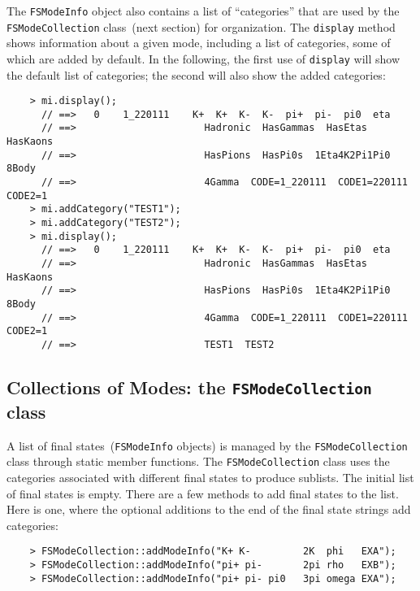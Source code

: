 \documentclass[11pt]{article}
\begin{document}
The {\tt FSModeInfo} object also contains a list of ``categories'' that are used by the {\tt FSModeCollection} class~(next section) for organization.  The {\tt display} method shows information about a given mode, including a list of categories, some of which are added by default.  In the following, the first use of {\tt display} will show the default list of categories; the second will also show the added categories:
\begin{verbatim}
    > mi.display();
      // ==>   0    1_220111    K+  K+  K-  K-  pi+  pi-  pi0  eta 
      // ==>                      Hadronic  HasGammas  HasEtas  HasKaons  
      // ==>                      HasPions  HasPi0s  1Eta4K2Pi1Pi0  8Body  
      // ==>                      4Gamma  CODE=1_220111  CODE1=220111  CODE2=1
    > mi.addCategory("TEST1");
    > mi.addCategory("TEST2");
    > mi.display();
      // ==>   0    1_220111    K+  K+  K-  K-  pi+  pi-  pi0  eta 
      // ==>                      Hadronic  HasGammas  HasEtas  HasKaons  
      // ==>                      HasPions  HasPi0s  1Eta4K2Pi1Pi0  8Body  
      // ==>                      4Gamma  CODE=1_220111  CODE1=220111  CODE2=1
      // ==>                      TEST1  TEST2
\end{verbatim}

\subsection{Collections of Modes: the {\tt FSModeCollection} class}
\label{sec:modecollection}

A list of final states~({\tt FSModeInfo} objects) is managed by the {\tt FSModeCollection} class through static member functions.  The {\tt FSModeCollection} class uses the categories associated with different final states to produce sublists.  The initial list of final states is empty.  There are a few methods to add final states to the list.  Here is one, where the optional additions to the end of the final state strings add categories:
\begin{verbatim}
    > FSModeCollection::addModeInfo("K+ K-         2K  phi   EXA");
    > FSModeCollection::addModeInfo("pi+ pi-       2pi rho   EXB");
    > FSModeCollection::addModeInfo("pi+ pi- pi0   3pi omega EXA");
\end{verbatim}
\end{document}
